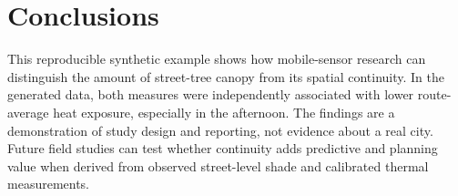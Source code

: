 \section{Conclusions}
This reproducible synthetic example shows how mobile-sensor research can distinguish the amount of street-tree canopy from its spatial continuity. In the generated data, both measures were independently associated with lower route-average heat exposure, especially in the afternoon. The findings are a demonstration of study design and reporting, not evidence about a real city. Future field studies can test whether continuity adds predictive and planning value when derived from observed street-level shade and calibrated thermal measurements.
